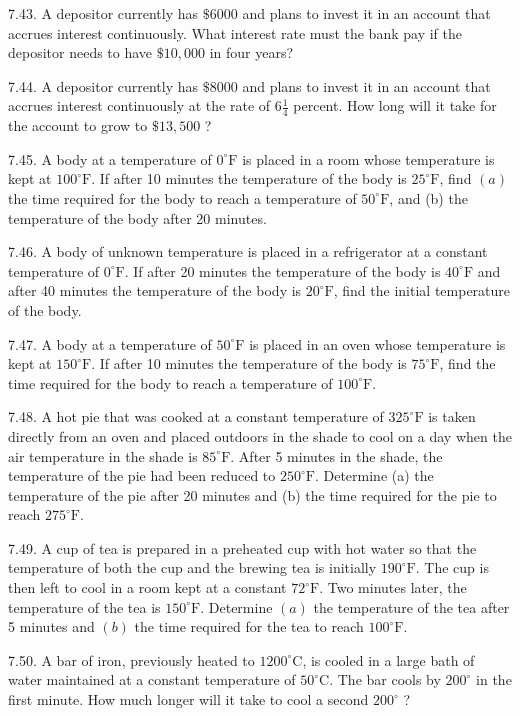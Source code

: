 \documentclass[10pt]{article}
\begin{document}
7.43. A depositor currently has $\$ 6000$ and plans to invest it in an account that accrues interest continuously. What interest rate must the bank pay if the depositor needs to have $\$ 10,000$ in four years?

7.44. A depositor currently has $\$ 8000$ and plans to invest it in an account that accrues interest continuously at the rate of $6 \frac{1}{4}$ percent. How long will it take for the account to grow to $\$ 13,500$ ?

7.45. A body at a temperature of $0^{\circ} \mathrm{F}$ is placed in a room whose temperature is kept at $100^{\circ} \mathrm{F}$. If after 10 minutes the temperature of the body is $25^{\circ} \mathrm{F}$, find $(a)$ the time required for the body to reach a temperature of $50^{\circ} \mathrm{F}$, and (b) the temperature of the body after 20 minutes.

7.46. A body of unknown temperature is placed in a refrigerator at a constant temperature of $0^{\circ} \mathrm{F}$. If after 20 minutes the temperature of the body is $40^{\circ} \mathrm{F}$ and after 40 minutes the temperature of the body is $20^{\circ} \mathrm{F}$, find the initial temperature of the body.

7.47. A body at a temperature of $50^{\circ} \mathrm{F}$ is placed in an oven whose temperature is kept at $150^{\circ} \mathrm{F}$. If after 10 minutes the temperature of the body is $75^{\circ} \mathrm{F}$, find the time required for the body to reach a temperature of $100^{\circ} \mathrm{F}$.

7.48. A hot pie that was cooked at a constant temperature of $325^{\circ} \mathrm{F}$ is taken directly from an oven and placed outdoors in the shade to cool on a day when the air temperature in the shade is $85^{\circ} \mathrm{F}$. After 5 minutes in the shade, the temperature of the pie had been reduced to $250^{\circ} \mathrm{F}$. Determine (a) the temperature of the pie after 20 minutes and (b) the time required for the pie to reach $275^{\circ} \mathrm{F}$.

7.49. A cup of tea is prepared in a preheated cup with hot water so that the temperature of both the cup and the brewing tea is initially $190^{\circ} \mathrm{F}$. The cup is then left to cool in a room kept at a constant $72^{\circ} \mathrm{F}$. Two minutes later, the temperature of the tea is $150^{\circ} \mathrm{F}$. Determine $(a)$ the temperature of the tea after 5 minutes and $(b)$ the time required for the tea to reach $100^{\circ} \mathrm{F}$.

7.50. A bar of iron, previously heated to $1200^{\circ} \mathrm{C}$, is cooled in a large bath of water maintained at a constant temperature of $50^{\circ} \mathrm{C}$. The bar cools by $200^{\circ}$ in the first minute. How much longer will it take to cool a second $200^{\circ}$ ?
\end{document}
